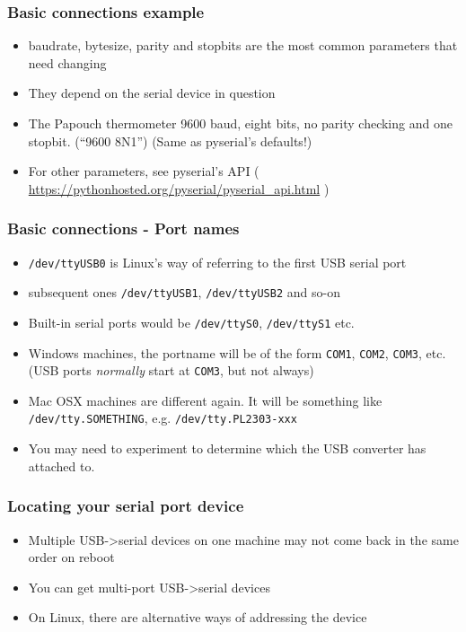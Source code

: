 \documentclass[aspectratio=1610,9pt]{beamer} %
\begin{document}
\begin{frame}[fragile]
\frametitle{Basic connections example}

\begin{itemize}[<+->]
\itemsep1pt\parskip0pt
\item<1->
  baudrate, bytesize, parity and stopbits are the most common parameters
  that need changing
\item<2->
  They depend on the serial device in question
\item<3->
  The Papouch thermometer 9600 baud, eight bits, no parity checking and
  one stopbit. (``9600 8N1'') (Same as pyserial's defaults!)
\item<4->
  For other parameters, see pyserial's API (
  \href{https://pythonhosted.org/pyserial/pyserial_api.html}{https://pythonhosted.org/pyserial/pyserial\_api.html}
  )
\end{itemize}
\end{frame}
\begin{frame}[fragile]
\frametitle{Basic connections - Port names}

\begin{itemize}
\itemsep1pt\parskip0pt
\item
  \texttt{/dev/ttyUSB0} is Linux's way of referring to the first USB
  serial port
\item
  subsequent ones \texttt{/dev/ttyUSB1}, \texttt{/dev/ttyUSB2} and so-on
\item
  Built-in serial ports would be \texttt{/dev/ttyS0},
  \texttt{/dev/ttyS1} etc.
\item
  Windows machines, the portname will be of the form \texttt{COM1},
  \texttt{COM2}, \texttt{COM3}, etc. (USB ports \emph{normally} start at
  \texttt{COM3}, but not always)
\item
  Mac OSX machines are different again. It will be something like
  \texttt{/dev/tty.SOMETHING}, e.g. \texttt{/dev/tty.PL2303-xxx}
\item
  You may need to experiment to determine which the USB converter has
  attached to.
\end{itemize}
\end{frame}
\begin{frame}[fragile]
\frametitle{Locating your serial port device}

\begin{itemize}
\itemsep1pt\parskip0pt
\item
  Multiple USB-\textgreater{}serial devices on one machine may not come
  back in the same order on reboot
\item
  You can get multi-port USB-\textgreater{}serial devices
\item
  On Linux, there are alternative ways of addressing the device
\end{itemize}
\end{frame}
\end{document}
